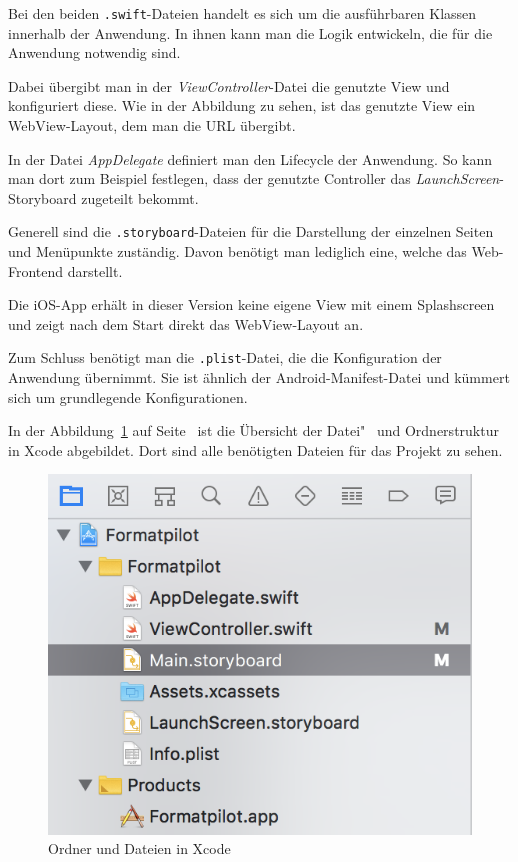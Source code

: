Bei den beiden \texttt{.swift}-Dateien handelt es sich um die ausführbaren Klassen innerhalb der Anwendung. In ihnen
kann man die Logik entwickeln, die für die Anwendung notwendig sind.

Dabei übergibt man in der \textit{ViewController}-Datei die genutzte View und konfiguriert diese. Wie in der Abbildung
zu sehen, ist das genutzte View ein WebView-Layout, dem man die URL übergibt.

In der Datei \textit{AppDelegate} definiert man den Lifecycle der Anwendung. So kann man dort zum Beispiel festlegen,
dass der genutzte Controller das \textit{LaunchScreen}-Storyboard zugeteilt bekommt.

Generell sind die \texttt{.storyboard}-Dateien für die Darstellung der einzelnen Seiten und Menüpunkte zuständig. Davon
benötigt man lediglich eine, welche das Web-Frontend darstellt.

Die iOS-App erhält in dieser Version keine eigene View mit einem Splashscreen und zeigt nach dem Start direkt das
WebView-Layout an.

Zum Schluss benötigt man die \texttt{.plist}-Datei, die die Konfiguration der Anwendung übernimmt. Sie ist ähnlich der
Android-Manifest-Datei und kümmert sich um grundlegende Konfigurationen.

In der Abbildung~\ref{fig:umsetzung_ios_folder} auf Seite~\pageref{fig:umsetzung_ios_folder} ist die Übersicht der
Datei"~ und Ordnerstruktur in Xcode abgebildet. Dort sind alle benötigten Dateien für das Projekt zu sehen.

\begin{figure}[h]
    \centering
    \includegraphics[scale=0.6]{images/kapitel_4/ios_folder.png}
    \caption{Ordner und Dateien in Xcode}
    \label{fig:umsetzung_ios_folder}
\end{figure}

